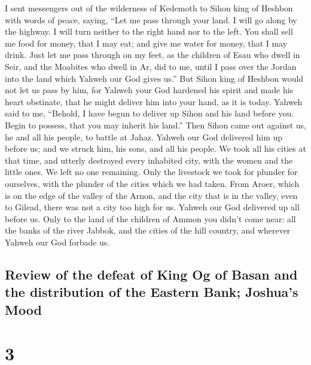  I sent messengers out of the wilderness of Kedemoth to
Sihon king of Heshbon with words of peace, saying,  ``Let
me pass through your land. I will go along by the highway. I will turn
neither to the right hand nor to the left.  You shall
sell me food for money, that I may eat; and give me water for money,
that I may drink. Just let me pass through on my feet, 
as the children of Esau who dwell in Seir, and the Moabites who dwell in
Ar, did to me, until I pass over the Jordan into the land which Yahweh
our God gives us.''  But Sihon king of Heshbon would not
let us pass by him, for Yahweh your God hardened his spirit and made his
heart obstinate, that he might deliver him into your hand, as it is
today.  Yahweh said to me, ``Behold, I have begun to
deliver up Sihon and his land before you. Begin to possess, that you may
inherit his land.''  Then Sihon came out against us, he
and all his people, to battle at Jahaz.  Yahweh our God
delivered him up before us; and we struck him, his sons, and all his
people.  We took all his cities at that time, and utterly
destroyed every inhabited city, with the women and the little ones. We
left no one remaining.  Only the livestock we took for
plunder for ourselves, with the plunder of the cities which we had
taken.  From Aroer, which is on the edge of the valley of
the Arnon, and the city that is in the valley, even to Gilead, there was
not a city too high for us. Yahweh our God delivered up all before us.
 Only to the land of the children of Ammon you didn't
come near: all the banks of the river Jabbok, and the cities of the hill
country, and wherever Yahweh our God forbade us.

\hypertarget{review-of-the-defeat-of-king-og-of-basan-and-the-distribution-of-the-eastern-bank-joshuas-mood}{%
\subsection{Review of the defeat of King Og of Basan and the
distribution of the Eastern Bank; Joshua's
Mood}\label{review-of-the-defeat-of-king-og-of-basan-and-the-distribution-of-the-eastern-bank-joshuas-mood}}

\hypertarget{section-2}{%
\section{3}\label{section-2}}

